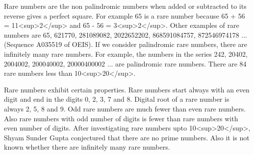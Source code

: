 \documentclass[12pt]{article}
\begin{document}
Rare numbers are the non palindromic numbers when added or subtracted to its reverse gives a perfect square. For example 65 is a rare number because 65 + 56 = 11<sup>2</sup> and 65 - 56 = 3<sup>2</sup>. Other examples of rare numbers are 65, 621770, 281089082, 2022652202, 868591084757, 872546974178 ... (Sequence A035519 of OEIS). If we consider palindromic rare numbers, there are infinitely many rare numbers. For example, the numbers in the series 242, 20402, 2004002, 200040002, 20000400002 ... are palindromic rare numbers. There are 84 rare numbers less than 10<sup>20</sup>.

Rare numbers exhibit certain properties. Rare numbers start always with an even digit and end in the digits 0, 2, 3, 7 and 8. Digital root of a rare number is always 2, 5, 8 and 9. Odd rare numbers are much fewer than even rare numbers. Also rare numbers with odd number of digits is fewer than rare numbers with even number of digits. After investigating rare numbers upto 10<sup>20</sup>, Shyam Sunder Gupta conjectured that there are no prime numbers. Also it is not known whether there are infinitely many rare numbers.
\end{document}
